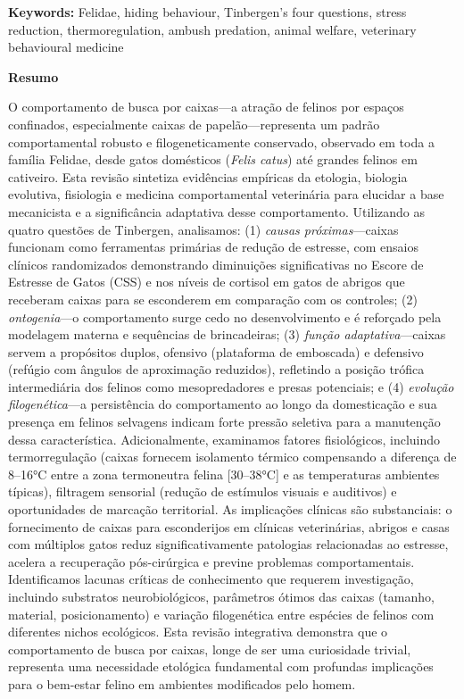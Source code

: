 \documentclass[12pt,a4paper]{article}
\begin{document}
\vspace{1em}

\noindent
\textbf{Keywords:} Felidae, hiding behaviour, Tinbergen's four questions, stress reduction, thermoregulation, ambush predation, animal welfare, veterinary behavioural medicine

\newpage

\begin{center}
\textbf{\Large Resumo}
\end{center}

\noindent
O comportamento de busca por caixas—a atração de felinos por espaços confinados, especialmente caixas de papelão—representa um padrão comportamental robusto e filogeneticamente conservado, observado em toda a família Felidae, desde gatos domésticos (\textit{Felis catus}) até grandes felinos em cativeiro. Esta revisão sintetiza evidências empíricas da etologia, biologia evolutiva, fisiologia e medicina comportamental veterinária para elucidar a base mecanicista e a significância adaptativa desse comportamento. Utilizando as quatro questões de Tinbergen, analisamos: (1) \textit{causas próximas}—caixas funcionam como ferramentas primárias de redução de estresse, com ensaios clínicos randomizados demonstrando diminuições significativas no Escore de Estresse de Gatos (CSS) e nos níveis de cortisol em gatos de abrigos que receberam caixas para se esconderem em comparação com os controles; (2) \textit{ontogenia}—o comportamento surge cedo no desenvolvimento e é reforçado pela modelagem materna e sequências de brincadeiras; (3) \textit{função adaptativa}—caixas servem a propósitos duplos, ofensivo (plataforma de emboscada) e defensivo (refúgio com ângulos de aproximação reduzidos), refletindo a posição trófica intermediária dos felinos como mesopredadores e presas potenciais; e (4) \textit{evolução filogenética}—a persistência do comportamento ao longo da domesticação e sua presença em felinos selvagens indicam forte pressão seletiva para a manutenção dessa característica. Adicionalmente, examinamos fatores fisiológicos, incluindo termorregulação (caixas fornecem isolamento térmico compensando a diferença de 8–16°C entre a zona termoneutra felina [30–38°C] e as temperaturas ambientes típicas), filtragem sensorial (redução de estímulos visuais e auditivos) e oportunidades de marcação territorial. As implicações clínicas são substanciais: o fornecimento de caixas para esconderijos em clínicas veterinárias, abrigos e casas com múltiplos gatos reduz significativamente patologias relacionadas ao estresse, acelera a recuperação pós-cirúrgica e previne problemas comportamentais. Identificamos lacunas críticas de conhecimento que requerem investigação, incluindo substratos neurobiológicos, parâmetros ótimos das caixas (tamanho, material, posicionamento) e variação filogenética entre espécies de felinos com diferentes nichos ecológicos. Esta revisão integrativa demonstra que o comportamento de busca por caixas, longe de ser uma curiosidade trivial, representa uma necessidade etológica fundamental com profundas implicações para o bem-estar felino em ambientes modificados pelo homem.
\end{document}
